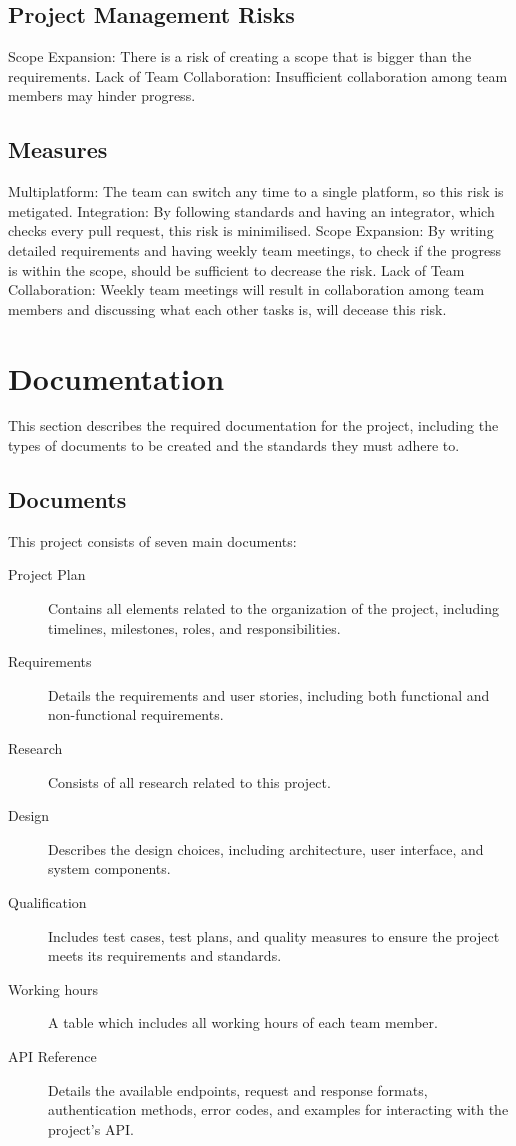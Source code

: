 \documentclass{projdoc}
\begin{document}
\subsection{Project Management Risks}
Scope Expansion: There is a risk of creating a scope that is bigger than the requirements.
Lack of Team Collaboration: Insufficient collaboration among team members 
may hinder progress.

\subsection{Measures}
Multiplatform: The team can switch any time to a single platform, so this risk is metigated. 
Integration: By following standards and having an integrator, which checks every pull request, this risk is minimilised.
Scope Expansion: By writing detailed requirements and having weekly team meetings, to check if the progress is within the scope, should be sufficient to decrease the risk.
Lack of Team Collaboration: Weekly team meetings will result in collaboration among team members and discussing what each other tasks is, will decease this risk.


\section{Documentation}
This section describes the required documentation for the project, including the types of documents to be created and the standards they must adhere to.

\subsection{Documents}
This project consists of seven main documents:\noparbreak
\begin{description}
	\item[Project Plan] Contains all elements related to the organization of the project, including timelines, milestones, roles, and responsibilities.
	\item[Requirements] Details the requirements and user stories, including both functional and non-functional requirements.
	\item[Research] Consists of all research related to this project.
	\item[Design] Describes the design choices, including architecture,
	user interface, and system components.
	\item[Qualification] Includes test cases, test plans, and quality 
	measures to ensure the project meets its requirements and standards.
	\item[Working hours] A table which includes all working hours of each team member.
	\item[API Reference] Details the available endpoints, request and response formats, authentication methods, error codes, and examples for interacting with the project's API.
\end{description}
\end{document}
